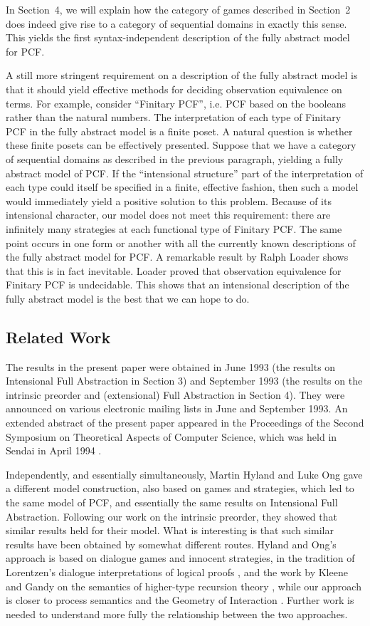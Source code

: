 \documentclass[11pt]{article}
\begin{document}
In Section~4, we will explain how the category of games described in Section~2 
does indeed give rise to a category of sequential domains in exactly this
sense. This yields the first syntax-independent description of the
fully abstract model for PCF.  

A still more stringent requirement on a description of the fully abstract model
is that it should yield effective methods for deciding observation
equivalence on terms. For example, consider ``Finitary PCF'', i.e. PCF
based on the booleans rather than the natural numbers. The interpretation
of each type of Finitary PCF in the fully abstract model is a finite poset.
A natural question is whether these finite posets can be
effectively
presented. Suppose that we have a category of sequential domains as described
in the previous paragraph, yielding a fully abstract model of PCF.
If the ``intensional structure'' part of the interpretation of each type
could itself be specified in a finite, effective fashion, then such a model
would immediately yield a positive solution to this problem.
Because of its intensional character, our model does not meet this requirement:
there are infinitely many strategies at each functional type of Finitary PCF.
The same point occurs in one form or another with all the currently known
descriptions of the fully abstract model for PCF.
A remarkable result by Ralph Loader \cite{Loa96} shows that this is in fact 
inevitable.
Loader proved that observation equivalence for Finitary PCF is undecidable.
This shows that an intensional description of the fully abstract model is
the best that we can hope to do.
\subsection*{Related Work}
The results in the present paper were obtained in June 1993 (the results on
Intensional Full Abstraction in Section 3) and September 1993 
(the results on the intrinsic
preorder and (extensional) Full Abstraction in Section 4).
They were announced on various electronic mailing lists in June and September
1993. An extended  abstract of the present paper appeared in the Proceedings
of the Second Symposium on Theoretical Aspects of Computer Science, which
was held in Sendai in April 1994 \cite{AbramskyS:fulap}.

Independently, and essentially simultaneously, Martin Hyland and Luke Ong
gave a different model construction, also based on games and strategies,
which led to the same model of PCF, and essentially the same results on 
Intensional
Full Abstraction. Following our work on the intrinsic preorder, they
showed that similar results held for their model. What is interesting
is that such similar results have been obtained by somewhat different routes.
Hyland and Ong's approach is based on dialogue games and innocent strategies,
in the tradition of Lorentzen's dialogue interpretations of logical proofs
\cite{LorenzenP:logua,LorenzenP:eindk}, and the work by Kleene and Gandy on the
semantics of higher-type 
recursion theory \cite{GandyRO:diabso}, while our approach is closer
to process semantics  
and the Geometry of Interaction
\cite{AbramskyS:gamfcm,MalacariaP:frogi}. Further work is needed to 
understand more fully the relationship between the two approaches.
\end{document}
